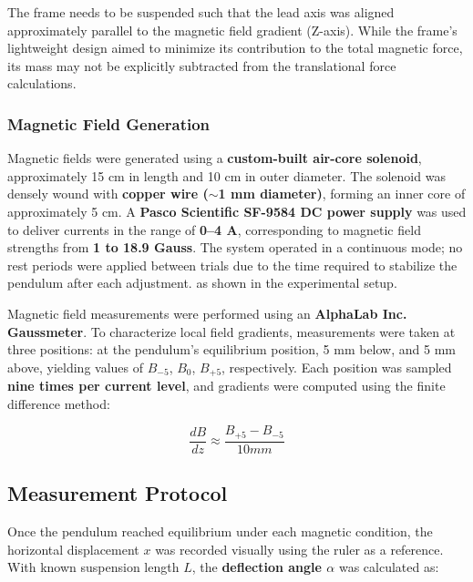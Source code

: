 The frame needs to be suspended such that the lead axis was aligned approximately parallel to the magnetic field gradient (Z-axis). While the frame's lightweight design aimed to minimize its contribution to the total magnetic force, its mass may not be explicitly subtracted from the translational force calculations.


\subsubsection*{Magnetic Field Generation}

Magnetic fields were generated using a \textbf{custom-built air-core solenoid}, approximately 15 cm in length and 10 cm in outer diameter. The solenoid was densely wound with \textbf{copper wire ($\sim$1 mm diameter)}, forming an inner core of approximately 5 cm. A \textbf{Pasco Scientific SF-9584 DC power supply} was used to deliver currents in the range of \textbf{0--4 A}, corresponding to magnetic field strengths from \textbf{1 to 18.9 Gauss}. The system operated in a continuous mode; no rest periods were applied between trials due to the time required to stabilize the pendulum after each adjustment. as shown in the experimental setup.


Magnetic field measurements were performed using an \textbf{AlphaLab Inc. Gaussmeter}. To characterize local field gradients, measurements were taken at three positions: at the pendulum's equilibrium position, 5 mm below, and 5 mm above, yielding values of $B_{-5}$, $B_0$, $B_{+5}$, respectively. Each position was sampled \textbf{nine times per current level}, and gradients were computed using the finite difference method:

\begin{equation}
	\frac{dB}{dz} \approx \frac{B_{+5} - B_{-5}}{10 mm}
\end{equation}

\subsection*{Measurement Protocol}

Once the pendulum reached equilibrium under each magnetic condition, the horizontal displacement $x$ was recorded visually using the ruler as a reference. With known suspension length $L$, the \textbf{deflection angle $\alpha$} was calculated as:

